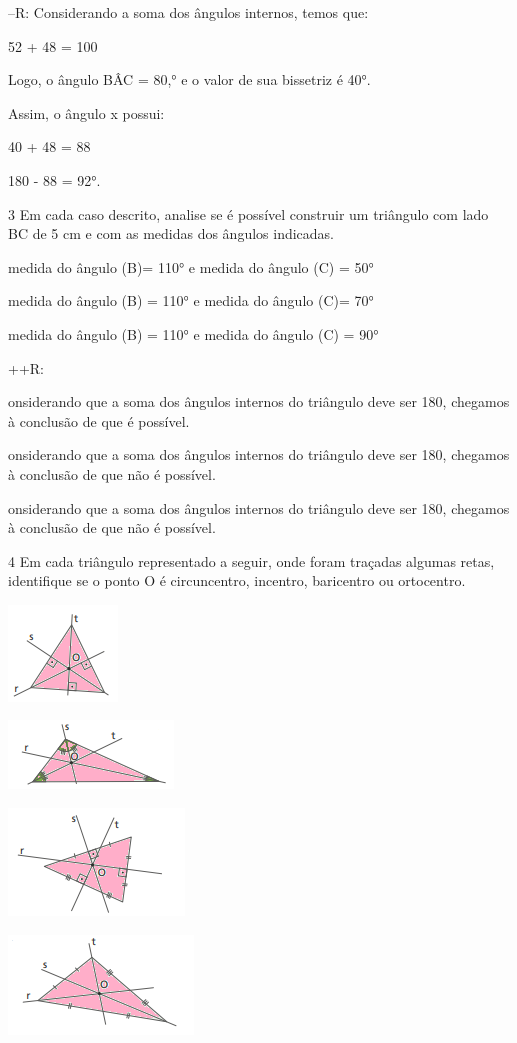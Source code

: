 {--R: Considerando a soma dos ângulos internos, temos que:

52 + 48 = 100

Logo, o ângulo BÂC = 80,° e o valor de sua bissetriz é 40°.

Assim, o ângulo x possui:

40 + 48 = 88

180 - 88 = 92°.

\num{3} Em cada caso descrito, analise se é possível construir um triângulo
com lado BC de 5 cm e com as medidas dos ângulos indicadas.
\item medida do ângulo (B)= 110° e medida do ângulo (C) = 50°
\item medida do ângulo (B) = 110° e medida do ângulo (C)= 70°
\item medida do ângulo (B) = 110° e medida do ângulo (C) = 90°

++R:
\item onsiderando que a soma dos ângulos internos do triângulo deve ser 180,
chegamos à conclusão de que é possível.
\item onsiderando que a soma dos ângulos internos do triângulo deve ser 180,
chegamos à conclusão de que não é possível.
\item onsiderando que a soma dos ângulos internos do triângulo deve ser 180,
chegamos à conclusão de que não é possível.

\num{4} Em cada triângulo representado a seguir, onde foram traçadas algumas
retas, identifique se o ponto O é circuncentro, incentro, baricentro ou
ortocentro.
\item
\includegraphics[width=1.14583in,height=1.01042in]{./imgSAEB_8_MAT/media/image15.png}
\item
\includegraphics[width=1.72917in,height=0.71875in]{./imgSAEB_8_MAT/media/image16.png}
\item
\includegraphics[width=1.84375in,height=1.125in]{./imgSAEB_8_MAT/media/image17.png}
\item
\includegraphics[width=1.9375in,height=1.04167in]{./imgSAEB_8_MAT/media/image18.png}

}
